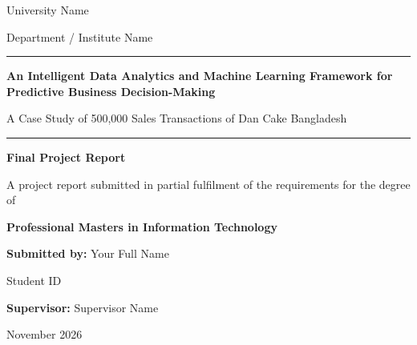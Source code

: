 \documentclass[12pt,a4paper,oneside]{report}
\newcommand{\StudentName}{Your Full Name}
\newcommand{\StudentID}{Student ID}
\newcommand{\Supervisor}{Supervisor Name}
\newcommand{\Programme}{Professional Masters in Information Technology}
\newcommand{\Department}{Department / Institute Name}
\newcommand{\University}{University Name}
\newcommand{\SubmissionDate}{November 2026}
\newcommand{\ProjectTitle}{An Intelligent Data Analytics and Machine Learning Framework for Predictive Business Decision-Making}
\newcommand{\ProjectSubtitle}{A Case Study of 500,000 Sales Transactions of Dan Cake Bangladesh}
\begin{document}
\begin{titlepage}
\centering
{\large \University\par}\vspace{2mm}
{\normalsize \Department\par}
\vspace{2.2cm}
{\color{brand}\rule{\linewidth}{1.2pt}\par}\vspace{6mm}
{\LARGE\bfseries\color{brand} \ProjectTitle\par}\vspace{5mm}
{\Large \ProjectSubtitle\par}\vspace{4mm}
{\color{brand}\rule{\linewidth}{1.2pt}\par}
\vspace{2cm}
{\large\bfseries\color{accent} Final Project Report\par}\vspace{6mm}
{\large A project report submitted in partial fulfilment of the requirements for the degree of\par}\vspace{2mm}
{\Large\bfseries \Programme\par}
\vspace{2cm}
{\large \textbf{Submitted by:} \StudentName\par \StudentID\par}\vspace{6mm}
{\large \textbf{Supervisor:} \Supervisor\par}
\vfill
{\large \SubmissionDate\par}
\end{titlepage}



\begingroup\singlespacing   %
\tableofcontents
\listoffigures
\listoftables
\endgroup

\cleardoublepage
{}








\renewcommand{\bibsection}{\chapter*{References}\addcontentsline{toc}{chapter}{References}\markboth{References}{References}}

\begingroup{}\small\setlength{\bibsep}{0.5pt plus 0.5pt}

\endgroup


\end{document}
